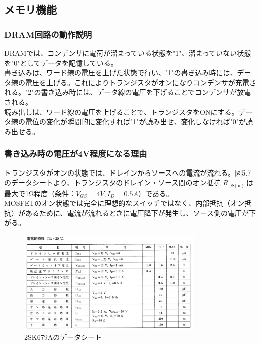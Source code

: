 \documentclass{jlreq}
\numberwithin{equation}{section}
\begin{document}
\subsection{メモリ機能}

\subsubsection{DRAM回路の動作説明}

DRAMでは、コンデンサに電荷が溜まっている状態を"1"、溜まっていない状態を"0"としてデータを記憶している。\\
書き込みは、ワード線の電圧を上げた状態で行い、"1"の書き込み時には、データ線の電圧を上げる。これによりトランジスタがオンになりコンデンサが充電される。"2"の書き込み時には、データ線の電圧を下げることでコンデンサが放電される。\\
読み出しは、ワード線の電圧を上げることで、トランジスタをONにする。データ線の電位の変化が瞬間的に変化すれば"1"が読み出せ、変化しなければ"0"が読み出せる。 \\

\subsubsection{書き込み時の電圧が4V程度になる理由}
トランジスタがオンの状態では、ドレインからソースへの電流が流れる。図5.7のデータシートより、トランジスタのドレイン・ソース間のオン抵抗 $R_{\text{DS(on)}}$ は最大で1Ω程度（条件：$V_{GS}=4V, I_D=0.5A$）である。\\
MOSFETのオン状態では完全に理想的なスイッチではなく、内部抵抗（オン抵抗）があるために、電流が流れるときに電圧降下が発生し、ソース側の電圧が下がる。

\begin{figure}[H]
  \centering
  \includegraphics[width=0.8\textwidth]{assets/datasheet.png}
  \caption{2SK679Aのデータシート}
\end{figure}
\end{document}
